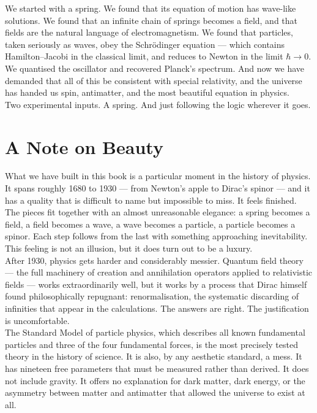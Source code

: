 \documentclass[krantz1,ChapterTOCs]{krantz}
\begin{document}
We started with a spring. We found that its equation of motion has
wave-like solutions. We found that an infinite chain of springs
becomes a field, and that fields are the natural language of
electromagnetism. We found that particles, taken seriously as
waves, obey the Schr\"{o}dinger equation --- which contains
Hamilton--Jacobi in the classical limit, and reduces to Newton
in the limit $\hbar \to 0$. We quantised the oscillator and
recovered Planck's spectrum. And now we have demanded that all
of this be consistent with special relativity, and the universe
has handed us spin, antimatter, and the most beautiful equation
in physics.\\

Two experimental inputs. A spring. And just following the logic
wherever it goes.\\

\section*{A Note on Beauty}

What we have built in this book is a particular moment in the
history of physics. It spans roughly 1680 to 1930 --- from Newton's
apple to Dirac's spinor --- and it has a quality that is difficult
to name but impossible to miss. It feels finished. The pieces fit
together with an almost unreasonable elegance: a spring becomes a
field, a field becomes a wave, a wave becomes a particle, a particle
becomes a spinor. Each step follows from the last with something
approaching inevitability.\\

This feeling is not an illusion, but it does turn out to be a luxury.\\

After 1930, physics gets harder and considerably messier. Quantum
field theory --- the full machinery of creation and annihilation
operators applied to relativistic fields --- works extraordinarily
well, but it works by a process that Dirac himself found
philosophically repugnant: renormalisation, the systematic
discarding of infinities that appear in the calculations. The
answers are right. The justification is uncomfortable.\\

The Standard Model of particle physics, which describes all known
fundamental particles and three of the four fundamental forces, is
the most precisely tested theory in the history of science. It is
also, by any aesthetic standard, a mess. It has nineteen free
parameters that must be measured rather than derived. It does not
include gravity. It offers no explanation for dark matter, dark
energy, or the asymmetry between matter and antimatter that allowed
the universe to exist at all.\\
\end{document}
